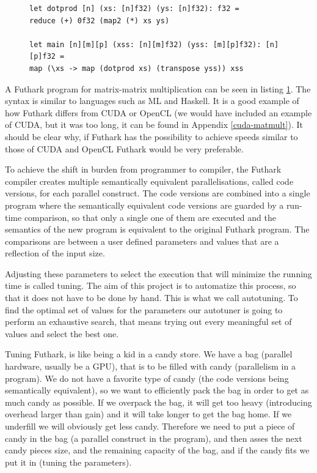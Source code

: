 \begin{figure}
\centering
\lstset{language=haskell}
\begin{lstlisting}
let dotprod [n] (xs: [n]f32) (ys: [n]f32): f32 =
reduce (+) 0f32 (map2 (*) xs ys)

let main [n][m][p] (xss: [n][m]f32) (yss: [m][p]f32): [n][p]f32 =
map (\xs -> map (dotprod xs) (transpose yss)) xss
\end{lstlisting}%
\label{IntromatmultFuthark}
\end{figure}
A Futhark program for matrix-matrix multiplication can be seen in listing
\ref{IntromatmultFuthark}. The syntax is similar to languages such as ML and
Haskell. It is a good example of how Futhark differs from CUDA or OpenCL (we
would have included an example of CUDA, but it was too long, it can be found in Appendix
\ref{cuda-matmult}). It should be clear why, if Futhark has the possibility to
achieve speeds similar to those of CUDA and OpenCL Futhark would be very
preferable.

To achieve the shift in burden from programmer to compiler, the Futhark
compiler creates multiple semantically equivalent parallelisations, called code
versions, for each parallel construct. The code versions are combined into
a single program where the semantically equivalent code versions are guarded
by a run-time comparison, so that only a single one of them are executed and the
semantics of the new program is equivalent to the original Futhark program. 
The comparisons are between a user defined parameters and values that are
a reflection of the input size.

Adjusting these parameters to select the execution that will minimize the
running time is called tuning. The aim of this project is to automatize this
process, so that it does not have to be done by hand. This is what we
call autotuning. To find the optimal set of values for the parameters our
autotuner is going to perform an exhaustive search, that means trying out every
meaningful set of values and select the best one.  

Tuning Futhark, is like being a kid in a candy store. We have a bag
(parallel hardware, usually be a GPU), that is to be filled
with candy (parallelism in a program). We do not have a favorite type of candy
(the code versions being semantically equivalent), so we want to
efficiently pack the bag in order to get as much candy as possible. If we
overpack the bag, it will get too heavy (introducing overhead larger than gain)
and it will take longer to get the bag home. If we underfill we will
obviously get less candy. 
Therefore we need to put a piece of candy in the bag
(a parallel construct in the program), and then asses the next candy pieces
size, and the remaining capacity of the bag, and if the candy fits we put it in
(tuning the parameters). 
